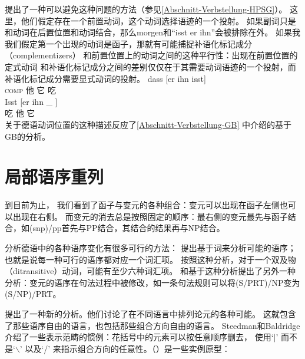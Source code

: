 \zl
\citet{KW91a}提出了一种可以避免这种问题的方法（参见\ref{Abschnitt-Verbstellung-HPSG}）。
这里，他们假定存在一个前置动词，这个动词选择语迹的一个投射。
如果副词只是和动词在后置位置和动词结合，那么morgen和“isst er ihn”会被排除在外。
如果我我们假定第一个出现的动词是函子，那就有可能捕捉补语化标记成分（complementizers）
和前置位置上的动词之间的这种平行性\citep{Hoehle97a}：出现在前置位置的定式动词
和补语化标记成分之间的差别仅仅在于其需要动词语迹的一个投射，而补语化标记成分需要显式动词的投射。
\eal
\ex 
\gll dass [er ihn isst]\\
     \textsc{comp} \spacebr{}他 它 吃\\
\ex 
\gll Isst [er ihn \_ ]\\
     吃 \spacebr{}他 它 \\
\zl
关于德语动词位置的这种描述反应了\ref{Abschnitt-Verbstellung-GB}
中介绍的基于GB的分析。

\section{局部语序重列}
\label{Abschnitt-CG-lokale-Umstellung}

到目前为止，
我们看到了函子与变元的各种组合：变元可以出现在函子左侧也可以出现在右侧。
而变元的消去总是按照固定的顺序：最右侧的变元最先与函子结合，如(s\bs np)/pp首先与PP结合，其结合的结果再与NP结合。 

分析德语中的各种语序变化有很多可行的方法：
\citet{Uszkoreit86b}提出基于词来分析可能的语序；也就是说每一种可行的语序都对应一个词汇项。
按照这种分析，对于一个双及物（ditransitive）动词，可能有至少六种词汇项。
\citet[]{Briscoe2000a}和\citet[--98]{Villavicencio2002a}基于这种分析提出了另外一种分析：变元的语序在句法过程中被修改，如一条句法规则可以将(S/PRT)/NP变为(S/NP)/PRT。

\citet{SB2006a-u}提出了一种新的分析。他们讨论了在不同语言中排列论元的各种可能。
这就包含了那些语序自由的语言，也包括那些组合方向自由的语言。
Steedman和Baldridge介绍了一些表示范畴的惯例：花括号中的元素可以按任意顺序删去，
使用`$|$'
\isc{$\vert$}\is{$\vert$}而不是`$\backslash$'
\isc{$\backslash$}\is{$\backslash$}以及`/'
\isc{/}\is{/}来指示组合方向的任意性。（）是一些实例原型：

